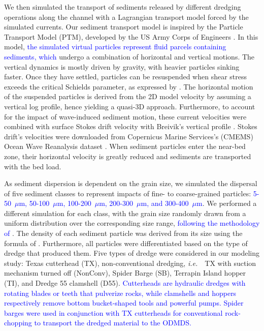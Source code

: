 \documentclass[preprint,12pt,authoryear]{elsarticle}
\newcommand{\ie}{{\it i.e.}\ }
\newcommand{\modif}[1]{\textcolor{blue}{#1}}
\begin{document}
We then simulated the transport of sediments released by different dredging operations along the channel with a Lagrangian transport model forced by the simulated currents. Our sediment transport model is inspired by the Particle Transport Model (PTM), developed by the US Army Corps of Engineers \citep{macdonald2006ptm}. In this model, \modif{the simulated virtual particles represent fluid parcels containing sediments, which} undergo a combination of horizontal and vertical motions. The vertical dynamics is mostly driven by gravity, with heavier particles sinking faster. Once they have settled, particles can be resuspended when shear stress exceeds the critical Schields parameter, as expressed by \cite{soulsby1997threshold}. The horizontal motion of the suspended particles is derived from the 2D model velocity by assuming a vertical log profile, hence yielding a quasi-3D approach. Furthermore, to account for the impact of wave-induced sediment motion, these current velocities were combined with surface Stokes drift velocity with Breivik's vertical profile \citep{breivik2016stokes}. Stokes drift's velocities were downloaded from Copernicus Marine Services's (CMEMS) Ocean Wave Reanalysis dataset \citep{cmems}. When sediment particles enter the near-bed zone, their horizontal velocity is greatly reduced and sediments are transported with the bed load.

As sediment dispersion is dependent on the grain size, we simulated the dispersal of five sediment classes to represent impacts of fine- to coarse-grained particles:  \modif{5-50~$\mu$m, 50-100~$\mu$m, 100-200~$\mu$m, 200-300~$\mu$m, and 300-400~$\mu$m}. We performed a  different simulation for each class, with the grain size randomly drawn from a uniform distribution over the corresponding size range, \modif{following the methodology of \cite{saint2022quantifying}}. The density of each sediment particle was derived from its size using the formula of \cite{hamilton1982sound}. Furthermore, all particles were differentiated based on the type of dredge that produced them. Five types of dredge were considered in our modeling study: Texas cutterhead (TX), non-conventional dredging, \ie~TX with suction mechanism turned off (NonConv), Spider Barge (SB), Terrapin Island hopper (TI), and Dredge 55 clamshell (D55). \modif{Cutterheads are hydraulic dredges with rotating blades or teeth that pulverize rocks, while clamshells and hoppers respectively remove bottom  bucket-shaped tools and powerful pumps. Spider barges were used in conjunction with TX cutterheads for conventional rock-chopping to transport the dredged material to the ODMDS.}
\end{document}
